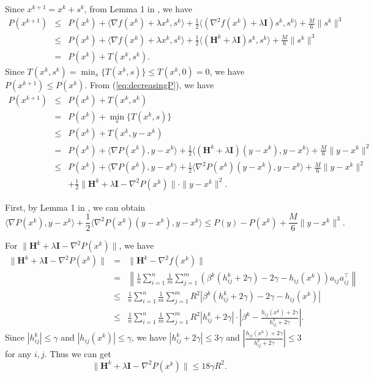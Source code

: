 \documentclass[12pt]{article}
\newcommand{\newalpha}{h}
\newcommand{\mH}{\mathbf{H}}
\newcommand{\mI}{\mathbf{I}}
\begin{document}
Since $x^{k+1} = x^k + s^k$, from Lemma 1 in \citep{PN2006-cubic}, we have 
\begin{eqnarray}
P(x^{k+1}) &\leq& P(x^k) + \langle \nabla f(x^k) + \lambda x^k, s^k \rangle + \frac{1}{2} \langle (\nabla^2 f(x^k) + \lambda \mI)s^k, s^k \rangle + \frac{M}{6}\|s^k\|^3 \nonumber \\ 
&\leq&  P(x^k) + \langle \nabla f(x^k) + \lambda x^k, s^k \rangle + \frac{1}{2} \langle (\mH^k + \lambda \mI)s^k, s^k \rangle + \frac{M}{6}\|s^k\|^3 \nonumber \\ 
&=& P(x^k) + T(x^k, s^k). \label{eq:decreasingP}
\end{eqnarray}
Since $T(x^k, s^k) = \min_{s}\{  T(x^k, s)  \} \leq T(x^k, 0)=0$, we have $P(x^{k+1}) \leq P(x^k)$.  From (\ref{eq:decreasingP}), we have 
\begin{eqnarray*}
	P(x^{k+1}) &\leq& P(x^k) + T(x^k, s^k)\\
	&=& P(x^k) + \min_{s}\{  T(x^k, s)  \}  \\ 
	&\leq& P(x^k) + T(x^k, y - x^k) \\ 
	&=& P(x^k) + \langle \nabla P(x^k), y-x^k \rangle + \frac{1}{2} \langle (\mH^k + \lambda \mI)(y-x^k), y-x^k \rangle + \frac{M}{6}\|y-x^k\|^2 \\ 
	&\leq& P(x^k) + \langle \nabla P(x^k), y-x^k \rangle + \frac{1}{2} \langle \nabla^2 P(x^k)(y-x^k), y-x^k \rangle + \frac{M}{6}\|y-x^k\|^2\\ 
	&& + \frac{1}{2} \|\mH^k + \lambda \mI - \nabla^2 P(x^k)\| \cdot \|y-x^k\|^2. 
\end{eqnarray*}

First, by Lemma 1 in \citep{PN2006-cubic}, we can obtain 
$$
\langle \nabla P(x^k), y-x^k \rangle + \frac{1}{2} \langle \nabla^2 P(x^k)(y-x^k), y-x^k \rangle \leq P(y) - P(x^k) + \frac{M}{6}\|y-x^k\|^3. 
$$

For $ \|\mH^k + \lambda \mI - \nabla^2 P(x^k)\| $, we have 
\begin{eqnarray*}
	\|\mH^k + \lambda \mI - \nabla^2 P(x^k)\| &=& \|\mH^k - \nabla^2 f(x^k)\| \\
	&=& \left\| \frac{1}{n} \sum_{i=1}^n \frac{1}{m} \sum_{j=1}^m \left(  \beta^k (h_{ij}^k + 2\gamma) - 2\gamma - \newalpha_{ij}(x^k)  \right)a_{ij}a_{ij}^\top \right\| \\ 
	&\leq&  \frac{1}{n} \sum_{i=1}^n \frac{1}{m} \sum_{j=1}^m R^2 \left| \beta^k (h_{ij}^k + 2\gamma) - 2\gamma - \newalpha_{ij}(x^k) \right| \\ 
	&\leq&  \frac{1}{n} \sum_{i=1}^n \frac{1}{m} \sum_{j=1}^m R^2 \left| h_{ij}^k + 2\gamma   \right| \cdot \left| \beta^k  - \frac{\newalpha_{ij}(x^k) + 2\gamma}{h_{ij}^k + 2\gamma} \right|. 
\end{eqnarray*}
Since $|h_{ij}^k| \leq \gamma$ and $|\newalpha_{ij}(x^k)| \leq \gamma$, we have $|h_{ij}^k + 2\gamma| \leq 3\gamma$ and $\left| \frac{\newalpha_{ij}(x^k) + 2\gamma}{h_{ij}^k + 2\gamma} \right| \leq 3$ for any $i,j$.  Thus we can get 
$$
\|\mH^k + \lambda \mI - \nabla^2 P(x^k)\| \leq 18\gamma R^2. 
$$
\end{document}

